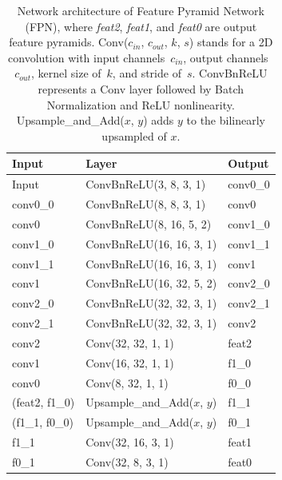 \begin{table}[!t]
    \begin{center}
        \begin{threeparttable}
            \begin{tabular}{lll}
            Input &  Layer & Output  \\
            \hline
            Input & ConvBnReLU(3, 8, 3, 1) & conv0\_0  \\
            conv0\_0 & ConvBnReLU(8, 8, 3, 1) & conv0 \\
            conv0 & ConvBnReLU(8, 16, 5, 2) & conv1\_0 \\
            conv1\_0 & ConvBnReLU(16, 16, 3, 1) & conv1\_1 \\
            conv1\_1 & ConvBnReLU(16, 16, 3, 1) & conv1 \\
            conv1 & ConvBnReLU(16, 32, 5, 2) & conv2\_0 \\
            conv2\_0 & ConvBnReLU(32, 32, 3, 1) & conv2\_1 \\
            conv2\_1 & ConvBnReLU(32, 32, 3, 1) & conv2 \\
            conv2 & Conv(32, 32, 1, 1) & feat2 \\
            conv1 & Conv(16, 32, 1, 1) & f1\_0 \\
            conv0 & Conv(8, 32, 1, 1) & f0\_0 \\
            (feat2, f1\_0) & Upsample\_and\_Add($x$, $y$) & f1\_1 \\
            (f1\_1, f0\_0) & Upsample\_and\_Add($x$, $y$) & f0\_1 \\
            f1\_1 & Conv(32, 16, 3, 1) & feat1 \\
            f0\_1 & Conv(32, 8, 3, 1) & feat0 \\
            \hline
            \end{tabular}
        \end{threeparttable}
    \end{center}
    \caption{Network architecture of Feature Pyramid Network (FPN), where \textit{feat2}, \textit{feat1}, and \textit{feat0} are output feature pyramids. Conv($c_{in}$, $c_{out}$, $k$, $s$) stands for a 2D convolution with input channels~$c_{in}$, output channels~$c_{out}$, kernel size of~$k$, and stride of~$s$. ConvBnReLU represents a Conv layer followed by Batch Normalization and ReLU nonlinearity. Upsample\_and\_Add($x$, $y$) adds $y$ to the bilinearly upsampled of $x$.}
    \label{table:arch_fpn}
    \vspace{4ex}
\end{table}

